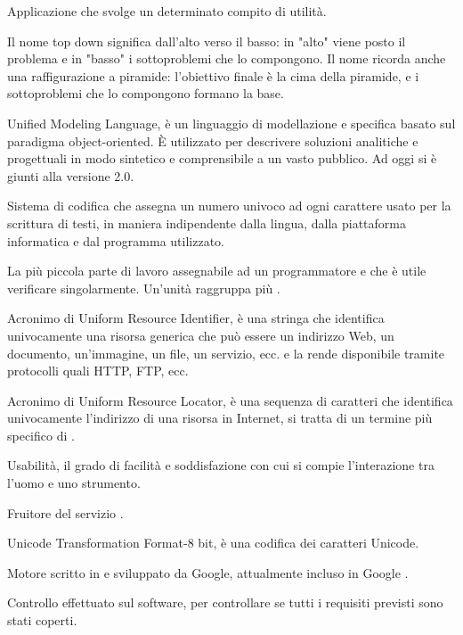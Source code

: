 Applicazione che svolge un determinato compito di utilità.

Il nome top down significa dall'alto verso il basso: in "alto" viene posto il problema e in "basso" i sottoproblemi che lo compongono. Il nome ricorda anche una raffigurazione a piramide: l'obiettivo finale è la cima della piramide, e i sottoproblemi che lo compongono formano la base.


Unified Modeling Language, è un linguaggio di modellazione e specifica basato sul paradigma object-oriented. 
È utilizzato per descrivere soluzioni analitiche e progettuali in modo sintetico e comprensibile a un vasto pubblico.
Ad oggi si è giunti alla versione 2.0.

Sistema di codifica che assegna un numero univoco ad ogni carattere usato per la scrittura di testi, in maniera indipendente dalla lingua, dalla piattaforma informatica e dal programma utilizzato.

La più piccola parte di lavoro assegnabile ad un programmatore e che è utile verificare singolarmente. Un'unità raggruppa più .

Acronimo di Uniform Resource Identifier, è una stringa che identifica univocamente una risorsa generica che può essere un indirizzo Web, un documento, un'immagine, un file, un servizio, ecc. e la rende disponibile tramite protocolli quali HTTP, FTP, ecc.

Acronimo di Uniform Resource Locator,  è una sequenza di caratteri che identifica univocamente l'indirizzo di una risorsa in Internet, si tratta di un termine più specifico di .

Usabilità, il grado di facilità e soddisfazione con cui si compie l'interazione tra l'uomo e uno strumento.

Fruitore del servizio \ProjectName{}.

Unicode Transformation Format-8 bit, è una codifica dei caratteri Unicode. 


Motore   scritto in   e sviluppato da Google, attualmente incluso in Google .

Controllo effettuato sul software, per controllare se tutti i requisiti previsti sono stati coperti.

